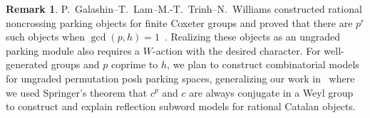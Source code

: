 \documentclass[10pt,a4paper]{amsart}
\theoremstyle{definition}
\newtheorem{remark}[theorem]{Remark}
\begin{document}
\begin{remark}
P.~Galashin--T.~Lam--M.-T.~Trinh--N.~Williams constructed rational noncrossing parking objects for finite Coxeter groups and proved that there are $p^r$ such objects when $\gcd(p,h)=1$~\cite[Theorem~1.8]{GLTWRational}.  Realizing these objects as an ungraded parking module also requires a $W$-action with the desired character.
For well-generated groups and $p$ coprime to $h$, we plan to construct combinatorial models for ungraded permutation posh parking spaces, generalizing our work in~\cite{DefantWilliams} where we used Springer's theorem that $c^p$ and $c$ are always conjugate in a Weyl group to construct and explain reflection subword models for rational Catalan objects.
\end{remark}




\end{document}

